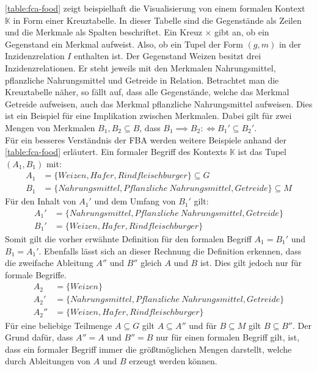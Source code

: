 \autoref{table:fca-food} zeigt beispielhaft die Visualisierung von einem formalen Kontext $\mathbb{K}$ in Form einer Kreuztabelle.
In dieser Tabelle sind die Gegenstände als Zeilen und die Merkmale als Spalten beschriftet.
Ein Kreuz $\times$ gibt an, ob ein Gegenstand ein Merkmal aufweist.
Also, ob ein Tupel der Form $(g,m)$ in der Inzidenzrelation $I$ enthalten ist.
Der Gegenstand Weizen besitzt drei Inzidenzrelationen.
Er steht jeweils mit den Merkmalen Nahrungsmittel, pflanzliche Nahrungsmittel und Getreide in Relation.
Betrachtet man die Kreuztabelle näher, so fällt auf, dass alle Gegenstände, welche das Merkmal Getreide aufweisen, auch das Merkmal pflanzliche Nahrungsmittel aufweisen.
Dies ist ein Beispiel für eine Implikation zwischen Merkmalen.
Dabei gilt für zwei Mengen von Merkmalen $B_1, B_2 \subseteq B$, dass $B_1\implies B_2 :\iff B_1' \subseteq B_2'$.\\

Für ein besseres Verständnis der \ac{FBA} werden weitere Beispiele anhand der \autoref{table:fca-food} erläutert.
Ein formaler Begriff des Kontexts $\mathbb{K}$ ist das Tupel $(A_1, B_1)$ mit:
\begin{align}
    A_1 & = \{Weizen, Hafer, Rindfleischburger\} \subseteq G                     \\
    B_1 & = \{Nahrungsmittel, Pflanzliche\ Nahrungsmittel,Getreide\} \subseteq M
\end{align}
Für den Inhalt von $A_1'$ und dem Umfang von $B_1'$ gilt:
\begin{align}
    A_1' & = \{Nahrungsmittel, Pflanzliche\ Nahrungsmittel, Getreide\} \\
    B_1' & = \{Weizen, Hafer, Rindfleischburger\}
\end{align}
Somit gilt die vorher erwähnte Definition für den formalen Begriff $A_1 = B_1'$ und $B_1 = A_1'$.
Ebenfalls lässt sich an dieser Rechnung die Definition erkennen, dass die zweifache Ableitung $A''$ und $B''$ gleich $A$ und $B$ ist.
Dies gilt jedoch nur für formale Begriffe.
\setcounter{equation}{0}
\begin{align}
    A_2   & = \{Weizen\}                                                \\
    A_2'  & = \{Nahrungsmittel, Pflanzliche\ Nahrungsmittel, Getreide\} \\
    A_2'' & = \{Weizen, Hafer, Rindfleischburger\}
\end{align}
Für eine beliebige Teilmenge $A \subseteq G$ gilt $A \subseteq A''$ und für $B \subseteq M$ gilt $B \subseteq B''$.
Der Grund dafür, dass $A'' = A$ und $B'' = B$ nur für einen formalen Begriff gilt, ist, dass ein formaler Begriff immer die größtmöglichen Mengen darstellt, welche durch Ableitungen von $A$ und $B$ erzeugt werden können.\\

